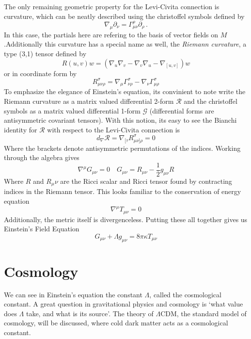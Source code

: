 The only remaining geometric property for the Levi-Civita connection is curvature, which can be neatly described using the christoffel symbols defined by
\begin{equation}
    \nabla_\mu\partial_\nu = \Gamma^{\rho}_{\mu\nu}\partial_\rho\,.
\end{equation}
In this case, the partials here are refering to the basis of vector fields on $M$.Additionally this curvature has a special name as well, the \textit{Riemann curvature}, a type (3,1) tensor defined by
\begin{equation}
    R(u,v)w = (\nabla_u\nabla_v-\nabla_v\nabla_u - \nabla_{[u,v]})w
\end{equation}
or in coordinate form by
\begin{equation}
    R_{\mu\nu\rho}^\sigma  = \nabla_\mu \Gamma^\sigma_{\nu\rho} - \nabla_\nu\Gamma^{\sigma}_{\mu\rho}
\end{equation}
To emphasize the elegance of Einstein's equation, its convinient to note write the Riemann curvature as a matrix valued differential 2-form $\mathcal{R}$ and the christoffel symbols as a matrix valued differential 1-form $\mathcal{G}$ (differential forms are antisymmetric covariant tensors). With this notion, its easy to see the Bianchi identity for $\mathcal{R}$ with respect to the Levi-Civita connection is
\begin{equation}
    d_{\nabla}\mathcal{R} = \nabla_{[\tau}R^\sigma_{\mu\nu]\rho} = 0
\end{equation}
Where the brackets denote antisymmetric permutations of the indices. Working through the algebra gives
\begin{equation}
    \nabla^\mu G_{\mu\nu} = 0\quad G_{\mu\nu} = R_{\mu\nu}-\frac{1}{2}g_{\mu\nu}R
\end{equation}
Where $R$ and $R_\mu\nu$ are the Ricci scalar and Ricci tensor found by contracting indices in the Riemann tensor. This looks familiar to the conservation of energy equation
\begin{equation}
    \nabla^\mu T_{\mu\nu}=0
\end{equation}
Additionally, the metric itself is divergenceless. Putting these all together gives us Einstein's Field Equation
\begin{equation}
    G_{\mu\nu} + \Lambda g_{\mu\nu} = 8\pi\kappa T_{\mu\nu}
\end{equation}

\section{Cosmology}
We can see in Einstein's equation the constant $\Lambda$, called the cosmological constant. A great question in gravitational physics and cosmology is `what value does $\Lambda$ take, and what is its source'. The theory of $\Lambda$CDM, the standard model of cosmology, will be discussed, where cold dark matter acts as a cosmological constant. 

